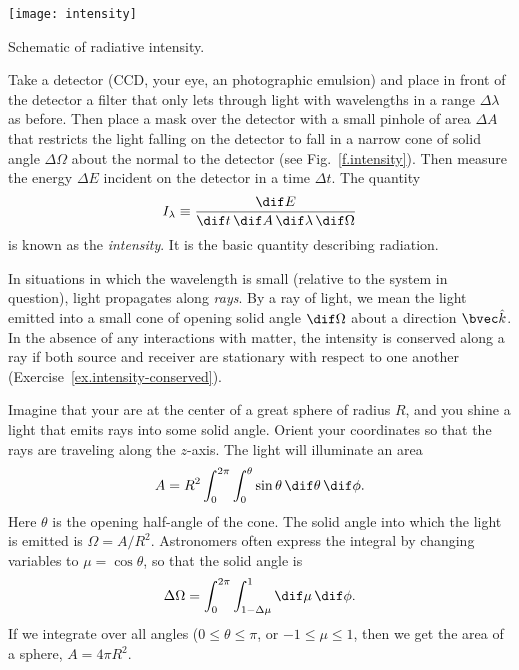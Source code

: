 \begin{marginfigure}[6\baselineskip]
\texttt{[image: intensity]}
\caption{\label{f.intensity} Schematic of radiative intensity.}
\end{marginfigure}
Take a detector (CCD, your eye, an photographic emulsion) and place in front of the detector a filter that only lets through light with wavelengths in a range $\Delta\lambda$ as before. Then place a mask over the detector with a small pinhole of area $\Delta A$ that restricts the light falling on the detector to fall in a narrow cone of solid angle $\Delta\Omega$ about the normal to the detector (see Fig.~\ref{f.intensity}). Then measure the energy $\Delta E$ incident on the detector in a time $\Delta t$. The quantity
\begin{equation}\label{e.definition-intensity}
I_{\lambda} \equiv \frac{\dif E}{\dif t\,\dif A\,\dif\lambda\,\dif\Omega}
\end{equation}
is known as the \emph{intensity}. It is the basic quantity describing radiation.

In situations in which the wavelength is small (relative to the system in question), light propagates along \emph{rays}. By a ray of light, we mean the light emitted into a small cone of opening solid angle $\dif\Omega$ about a direction $\unitk$. In the absence of any interactions with matter, the intensity is conserved along a ray if both source and receiver are stationary with respect to one another (Exercise~\ref{ex.intensity-conserved}).

\begin{sidebar}
Imagine that your are at the center of a great sphere of radius $R$, and you shine a light that emits rays into some solid angle. Orient your coordinates so that the rays are traveling along the $z$-axis. The light will illuminate an area
\[ 	A = R^{2}\int_{0}^{2\pi}\int_{0}^{\theta}\sin\theta\,\dif\theta\,\dif\phi. \]
Here $\theta$ is the opening half-angle of the cone. The solid angle into which the light is emitted is $\Omega = A/R^{2}$. Astronomers often express the integral by changing variables to $\mu = \cos\theta$, so that the solid angle is
\[
	\Delta\Omega = \int_{0}^{2\pi}\int_{1-\Delta\mu}^{1}\dif\mu\,\dif\phi.
\]
If we integrate over all angles ($0\le\theta\le\pi$, or $-1\le\mu\le 1$, then we get the area of a sphere, $A = 4\pi R^{2}$.
\end{sidebar}

